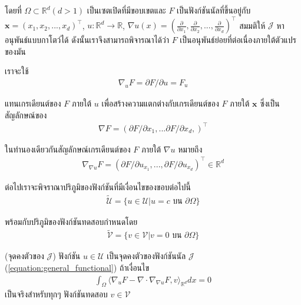 โดยที่ $\Omega \subset \mathbb{R}^{d} (d>1)$ เป็นเซตเปิดที่มีขอบเขตและ $F$ เป็นฟังก์ชันนัลที่ขึ้นอยู่กับ $\boldsymbol{x}=(x_1,x_2,...,x_d)^\top$, $u: \mathbb{R}^{d} \rightarrow \mathbb{R}$, $\nabla u (x) = ( \frac{\partial}{\partial x_1},\frac{\partial}{\partial x_2}, ... , \frac{\partial}{\partial x_d} )^\top$ สมมติให้ $\mathcal{J}$ หาอนุพันธ์แบบกาโตว์ได้ ดังนั้นเราจึงสามารถพิจารณาได้ว่า $F$ เป็นอนุพันธ์ย่อยที่ต่อเนื่องภายใต้ตัวแปรของมัน

\hspace{1cm} เราจะใช้
\begin{align}
    \nabla_{u} F = \partial F / \partial u = F_u
\end{align}

แทนเกรเดียนต์ของ $F$ ภายใต้ $u$ เพื่อสร้างความแตกต่างกับเกรเดียนต์ของ $F$ ภายใต้ $\boldsymbol{x}$ ซึ่งเป็นสัญลักษณ์ของ
\begin{align}
    \nabla F = (\partial F / \partial x_1, ... \partial F / \partial x_d, )^\top
\end{align}

ในทำนองเดียวกันสัญลักษณ์เกรเดียนต์ของ $F$ ภายใต้ $\nabla u$ หมายถึง
\begin{align}
    \nabla_{\nabla u} F = (\partial F / \partial u_{x_1},..., \partial F / \partial u_{x_d})^\top \in \mathbb{R}^d
\end{align}

\hspace{1cm}ต่อไปเราจะพิจราณาปริภูมิของฟังก์ชันที่มีเงื่อนไขของขอบต่อไปนี้
\begin{align}
    \tilde{\mathcal{U}} = \{u \in \mathcal{U} | u = c \text{ บน } \partial \Omega \}
\end{align}

พร้อมกับปริภูมิของฟังก์ชันทดสอบกำหนดโดย
\begin{align}
    \tilde{\mathcal{V}} = \{v \in \mathcal{V} | v = 0 \text{ บน } \partial \Omega \}
\end{align}

\begin{Lemma}
    (จุดคงตัวของ $\mathcal{J}$) ฟังก์ชัน $u \in \mathcal{U}$ เป็นจุดคงตัวของฟังก์ชันนัล $\mathcal{J}$ (\ref{equation:general_functional}) ถ้าเงื่อนไข
    \begin{align}
        \int_{\Omega} \Big \langle \nabla_u F - \nabla \cdot \nabla_{\nabla u} F,v \Big \rangle_{\mathbb{R}^{d}} dx = 0
        \label{equation:lemma_stationarypoint}
    \end{align}
    \label{lemma:stationary_point}
    เป็นจริงสำหรับทุกๆ ฟังก์ชันทดสอบ $v \in \mathcal{V}$
\end{Lemma}

